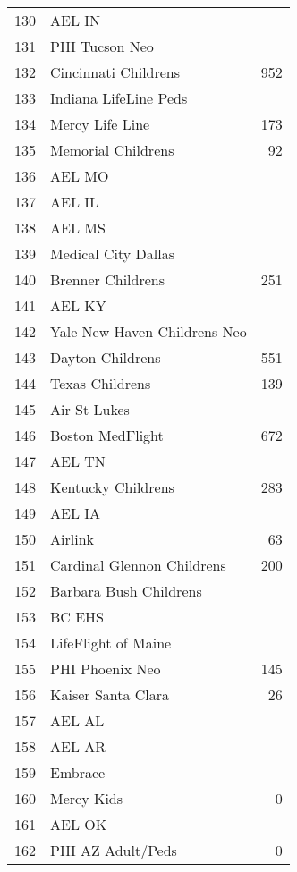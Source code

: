 \documentclass[twoside]{article}\usepackage[]{graphicx}\usepackage[]{color}
\begin{document}
\begin{table}[ht]
\begin{tabular}{rlr}
  130 & AEL IN &  \\ 
  131 & PHI Tucson Neo &  \\ 
  132 & Cincinnati Childrens & 952 \\ 
  133 & Indiana LifeLine Peds &  \\ 
  134 & Mercy Life Line & 173 \\ 
  135 & Memorial Childrens & 92 \\ 
  136 & AEL MO &  \\ 
  137 & AEL IL &  \\ 
  138 & AEL MS &  \\ 
  139 & Medical City Dallas &  \\ 
  140 & Brenner Childrens & 251 \\ 
  141 & AEL KY &  \\ 
  142 & Yale-New Haven Childrens Neo &  \\ 
  143 & Dayton Childrens & 551 \\ 
  144 & Texas Childrens & 139 \\ 
  145 & Air St Lukes &  \\ 
  146 & Boston MedFlight & 672 \\ 
  147 & AEL TN &  \\ 
  148 & Kentucky Childrens & 283 \\ 
  149 & AEL IA &  \\ 
  150 & Airlink & 63 \\ 
  151 & Cardinal Glennon Childrens & 200 \\ 
  152 & Barbara Bush Childrens &  \\ 
  153 & BC EHS &  \\ 
  154 & LifeFlight of Maine &  \\ 
  155 & PHI Phoenix Neo & 145 \\ 
  156 & Kaiser Santa Clara & 26 \\ 
  157 & AEL AL &  \\ 
  158 & AEL AR &  \\ 
  159 & Embrace &  \\ 
  160 & Mercy Kids & 0 \\ 
  161 & AEL OK &  \\ 
  162 & PHI AZ Adult/Peds & 0 \\ 
   \hline
\end{tabular}
\end{table}





\end{document}
